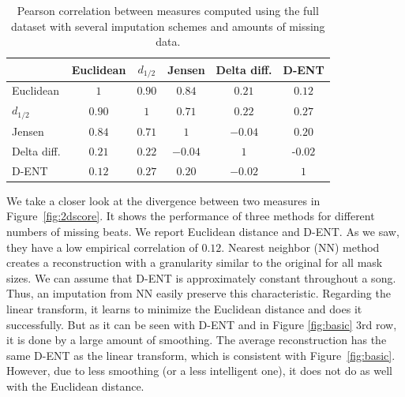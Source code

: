\documentclass{article}
\begin{document}
\begin{table}[t]
    \begin{center}
      \begin{tabular}{@{}l c c c c c @{}}
        \toprule
                            & Euclidean       & $d_{1/2}$ & Jensen & Delta diff. & D-ENT \\ 
        \midrule
        Euclidean           & $1$             & $0.90$ & $0.84$ & $0.21$  & $0.12$ \\ 
        $d_{1/2}$             & $0.90$          & $1$    & $0.71$ & $0.22$  & $0.27$ \\ 
        Jensen              & $0.84$          & $0.71$ & $1$    & $-0.04$ & $0.20$ \\ 
        Delta diff. & $\mathbf{0.21}$ & $0.22$ & $-0.04$ & $1$ & -$0.02$ \\ 
        D-ENT               & $\mathbf{0.12}$ & $0.27$ & $0.20$  & $-0.02$ & $1$ \\
        \bottomrule
      \end{tabular}
      \caption{Pearson correlation between measures computed using the full dataset 
               with several imputation schemes and amounts of missing data.}
      \label{tab:corrs}
    \end{center}
\end{table}

We take a closer look at the divergence between two measures in
Figure~\ref{fig:2dscore}.  It shows the performance of three methods
for different numbers of missing beats. We report Euclidean distance
and D-ENT. As we saw, they have a low empirical correlation of
$0.12$. Nearest neighbor (NN) method creates a reconstruction with a
granularity similar to the original for all mask sizes. We can assume
that D-ENT is approximately constant throughout a song. Thus, an
imputation from NN easily preserve this characteristic.  Regarding the
linear transform, it learns to minimize the Euclidean distance and
does it successfully. But as it can be seen with D-ENT and in Figure
\ref{fig:basic} $3$rd row, it is done by a large amount of
smoothing. The average reconstruction has the same D-ENT as the linear
transform, which is consistent with
Figure~\ref{fig:basic}.  However, due to less
smoothing (or a less intelligent one), it does not do as well with the
Euclidean distance.
\end{document}
